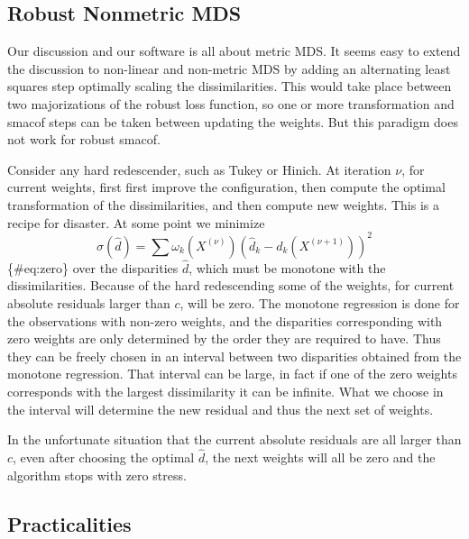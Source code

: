 \documentclass[
  12pt,
  letterpaper,
  DIV=11,
  numbers=noendperiod]{scrartcl}
\theoremstyle{plain}
\theoremstyle{plain}
\theoremstyle{plain}
\theoremstyle{definition}
\theoremstyle{definition}
\theoremstyle{remark}
\begin{document}
\subsection{Robust Nonmetric MDS}\label{robust-nonmetric-mds}

Our discussion and our software is all about metric MDS. It seems easy
to extend the discussion to non-linear and non-metric MDS by adding an
alternating least squares step optimally scaling the dissimilarities.
This would take place between two majorizations of the robust loss
function, so one or more transformation and smacof steps can be taken
between updating the weights. But this paradigm does not work for robust
smacof.

Consider any hard redescender, such as Tukey or Hinich. At iteration
\(\nu\), for current weights, first first improve the configuration,
then compute the optimal transformation of the dissimilarities, and then
compute new weights. This is a recipe for disaster. At some point we
minimize \[
\sigma(\hat d)=\sum \omega_k(X^{(\nu)})(\hat d_k-d_k(X^{(\nu+1)}))^2
\]\{\#eq:zero\} over the disparities \(\hat d\), which must be monotone
with the dissimilarities. Because of the hard redescending some of the
weights, for current absolute residuals larger than \(c\), will be zero.
The monotone regression is done for the observations with non-zero
weights, and the disparities corresponding with zero weights are only
determined by the order they are required to have. Thus they can be
freely chosen in an interval between two disparities obtained from the
monotone regression. That interval can be large, in fact if one of the
zero weights corresponds with the largest dissimilarity it can be
infinite. What we choose in the interval will determine the new residual
and thus the next set of weights.

In the unfortunate situation that the current absolute residuals are all
larger than \(c\), even after choosing the optimal \(\hat d\), the next
weights will all be zero and the algorithm stops with zero stress.

\subsection{Practicalities}\label{practicalities}
\end{document}
